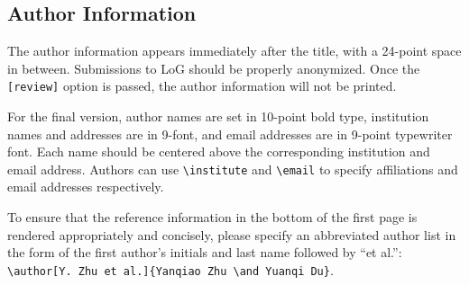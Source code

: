 \documentclass{article}
\begin{document}
\subsection{Author Information}
The author information appears immediately after the title, with a 24-point space in between.
Submissions to LoG \logyear{} should be properly anonymized.
Once the \verb+[review]+ option is passed, the author information will not be printed.

For the final version, author names are set in 10-point bold type, institution names and addresses are in 9-font, and email addresses are in 9-point typewriter font.
Each name should be centered above the corresponding institution and email address.
Authors can use \verb+\institute+ and \verb+\email+ to specify affiliations and email addresses respectively.

To ensure that the reference information in the bottom of the first page is rendered appropriately and concisely, please specify an abbreviated author list in the form of the first author's initials and last name followed by ``et al.'': \verb+\author[Y. Zhu et al.]{Yanqiao Zhu \and Yuanqi Du}+.
\end{document}
